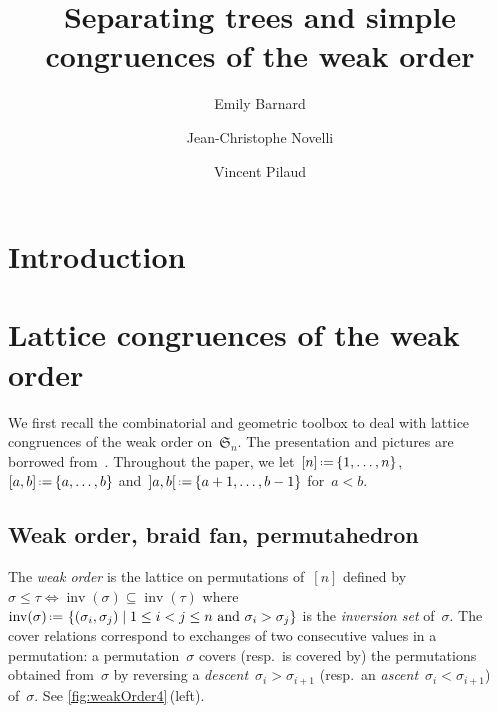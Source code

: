 \documentclass{amsart}
\title[Separating trees and simple comgruences]{Separating trees and simple congruences of the weak order}
\author{Emily Barnard}
\author{Jean-Christophe Novelli}
\author{Vincent Pilaud}
\theoremstyle{definition}
\newcommand{\f}[1]{{\mathfrak{#1}}} %
\newcommand{\set}[2]{\left\{ #1 \;\middle|\; #2 \right\}} %
\newcommand{\eqdef}{\mbox{\,\raisebox{0.2ex}{\scriptsize\ensuremath{\mathrm:}}\ensuremath{=}\,}} %
\DeclareMathOperator{\inv}{inv} %
\newcommand{\darkblue}{\color{darkblue}} %
\newcommand{\defn}[1]{\textsl{\darkblue #1}} %
\begin{document}
\begin{abstract}
\end{abstract}

\maketitle



\section{Introduction}
\label{sec:introduction}


\clearpage
\section{Lattice congruences of the weak order}
\label{sec:latticeCongruences}

We first recall the combinatorial and geometric toolbox to deal with lattice congruences of the weak order on~$\f{S}_n$.
The presentation and pictures are borrowed from~\cite{PilaudSantos-quotientopes, PadrolPilaudRitter}.
Throughout the paper, we let~$[n] \eqdef \{1, \dots, n\}$, $[a,b] \eqdef \{a, \dots, b\}$ and~${{]a,b[} \eqdef \{a+1, \dots, b-1\}}$ for~$a < b$.


\subsection{Weak order, braid fan, permutahedron}
\label{subsec:weakOrder}

The \defn{weak order} is the lattice on permutations of~$[n]$ defined by ${\sigma \le \tau \iff \inv(\sigma) \subseteq \inv(\tau)}$ where~$\inv(\sigma) \eqdef \set{(\sigma_i, \sigma_j)}{1 \le i < j \le n \text{ and } \sigma_i > \sigma_j}$ is the \defn{inversion set} of~$\sigma$.
The cover relations correspond to exchanges of two consecutive values in a permutation: a permutation~$\sigma$ covers (resp.~is covered by) the permutations obtained from~$\sigma$ by reversing a \defn{descent}~$\sigma_i > \sigma_{i+1}$ (resp.~an \defn{ascent}~$\sigma_i < \sigma_{i+1}$) of~$\sigma$.
See \cref{fig:weakOrder4}\,(left).
\end{document}
